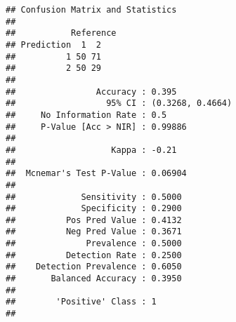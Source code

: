 \documentclass[
]{article}
\newenvironment{Shaded}{\begin{snugshade}}{\end{snugshade}}
\newcommand{\FunctionTok}[1]{\textcolor[rgb]{0.13,0.29,0.53}{\textbf{#1}}}
\newcommand{\NormalTok}[1]{#1}
\newcommand{\SpecialCharTok}[1]{\textcolor[rgb]{0.81,0.36,0.00}{\textbf{#1}}}
\begin{document}
\begin{Shaded}
\end{Shaded}

\begin{verbatim}
## Confusion Matrix and Statistics
## 
##           Reference
## Prediction  1  2
##          1 50 71
##          2 50 29
##                                           
##                Accuracy : 0.395           
##                  95% CI : (0.3268, 0.4664)
##     No Information Rate : 0.5             
##     P-Value [Acc > NIR] : 0.99886         
##                                           
##                   Kappa : -0.21           
##                                           
##  Mcnemar's Test P-Value : 0.06904         
##                                           
##             Sensitivity : 0.5000          
##             Specificity : 0.2900          
##          Pos Pred Value : 0.4132          
##          Neg Pred Value : 0.3671          
##              Prevalence : 0.5000          
##          Detection Rate : 0.2500          
##    Detection Prevalence : 0.6050          
##       Balanced Accuracy : 0.3950          
##                                           
##        'Positive' Class : 1               
## 
\end{verbatim}
\end{document}
